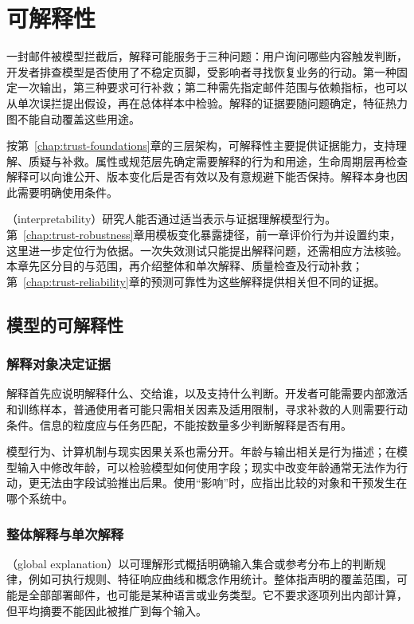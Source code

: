 \chapter{可解释性}
\label{chap:trust-interpretability}

一封邮件被模型拦截后，解释可能服务于三种问题：用户询问哪些内容触发判断，开发者排查模型是否使用了不稳定页脚，受影响者寻找恢复业务的行动。第一种固定一次输出，第三种要求可行补救；第二种需先指定邮件范围与依赖指标，也可以从单次误拦提出假设，再在总体样本中检验。解释的证据要随问题确定，特征热力图不能自动覆盖这些用途。

按第~\ref{chap:trust-foundations}章的三层架构，可解释性主要提供证据能力，支持理解、质疑与补救。属性或规范层先确定需要解释的行为和用途，生命周期层再检查解释可以向谁公开、版本变化后是否有效以及有意规避下能否保持。解释本身也因此需要明确使用条件。

（interpretability）研究人能否通过适当表示与证据理解模型行为。第~\ref{chap:trust-robustness}章用模板变化暴露捷径，前一章评价行为并设置约束，这里进一步定位行为依据。一次失效测试只能提出解释问题，还需相应方法核验。本章先区分目的与范围，再介绍整体和单次解释、质量检查及行动补救；第~\ref{chap:trust-reliability}章的预测可靠性为这些解释提供相关但不同的证据。

\section{模型的可解释性}
\label{sec:interpretability-purpose}

\subsection{解释对象决定证据}

解释首先应说明解释什么、交给谁，以及支持什么判断。开发者可能需要内部激活和训练样本，普通使用者可能只需相关因素及适用限制，寻求补救的人则需要行动条件。信息的粒度应与任务匹配，不能按数量多少判断解释是否有用。

模型行为、计算机制与现实因果关系也需分开。年龄与输出相关是行为描述；在模型输入中修改年龄，可以检验模型如何使用字段；现实中改变年龄通常无法作为行动，更无法由字段试验推出后果。使用“影响”时，应指出比较的对象和干预发生在哪个系统中。

\subsection{整体解释与单次解释}
\label{sec:interpretability-global-local}

（global explanation）以可理解形式概括明确输入集合或参考分布上的判断规律，例如可执行规则、特征响应曲线和概念作用统计。整体指声明的覆盖范围，可能是全部部署邮件，也可能是某种语言或业务类型。它不要求逐项列出内部计算，但平均摘要不能因此被推广到每个输入。

